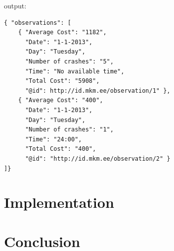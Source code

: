 \documentclass{llncs}
\begin{document}
output:
\begin{verbatim} 
{ "observations": [ 
	{ "Average Cost": "1182", 
   	  "Date": "1-1-2013", 
	  "Day": "Tuesday", 
	  "Number of crashes": "5",
	  "Time": "No available time",
      "Total Cost": "5908", 
	  "@id": http://id.mkm.ee/observation/1" }, 
	{ "Average Cost": "400",
	  "Date": "1-1-2013",
	  "Day": "Tuesday",
	  "Number of crashes": "1",
	  "Time": "24:00",
 	  "Total Cost": "400",
	  "@id": "http://id.mkm.ee/observation/2" }
]}
\end{verbatim}

\section{Implementation}\label{sec:impl}

\section{Conclusion}\label{sec:conclusion}






\end{document}
